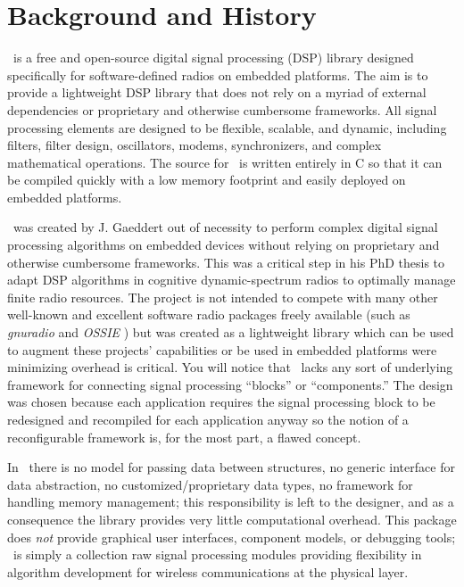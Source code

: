 %
%

\newpage
\section{Background and History}

\liquid\ is a free and open-source digital signal processing (DSP) library
designed specifically for software-defined radios on embedded platforms.
The aim is to provide a lightweight DSP library that does not rely on a myriad
of external dependencies or proprietary and otherwise cumbersome frameworks.
%
All signal processing elements are designed to be flexible, scalable, and
dynamic, including filters, filter design, oscillators, modems, synchronizers,
and complex mathematical operations.
The source for \liquid\ is written entirely in C so that it can be
compiled quickly with a low memory footprint
and easily deployed on embedded platforms.

\liquid\ was created by J. Gaeddert out of necessity to perform complex
digital signal processing algorithms on embedded devices
without relying on %
proprietary and otherwise cumbersome frameworks.
This was a critical step in his PhD thesis to adapt DSP algorithms in
cognitive dynamic-spectrum radios to optimally manage finite radio resources.
The project is not intended to compete with many other well-known and
excellent software radio packages freely available
(such as {\em gnuradio} \cite{gnuradio:web} and {\em OSSIE}
\cite{ossie:web})
but was created as a lightweight library which can be used to augment
these projects' capabilities
or be used in embedded platforms were minimizing overhead is critical.
You will notice that \liquid\ lacks any sort of underlying framework
for connecting signal processing ``blocks'' or ``components.''
The design was chosen because each application requires the signal
processing block to be redesigned and recompiled for each application
anyway so the notion of a reconfigurable framework is, for the most
part, a flawed concept.

In \liquid\ there is
no model for passing data between structures,
no generic interface for data abstraction,
no customized/proprietary data types,
no framework for handling memory management;
this responsibility is left to the designer,
and as a consequence the library provides very little computational overhead.
This package does {\em not} provide
graphical user interfaces,
component models, or
debugging tools;
\liquid\ is simply a collection raw signal processing modules
providing flexibility in algorithm development for wireless
communications at the physical layer.


